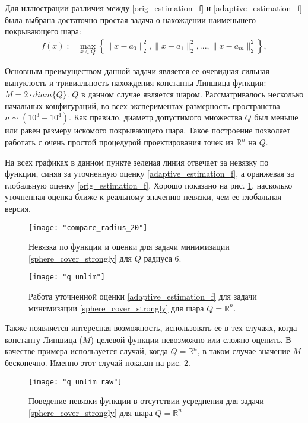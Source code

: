 Для иллюстрации различия между \eqref{orig_estimation_f} и \eqref{adaptive_estimation_f} была выбрана достаточно простая задача о нахождении наименьшего покрывающего шара:
\begin{gather}\label{sphere_cover_strongly}
    f(x) := \max_{x\in Q}\left\{\|x - a_0\|_2^2, \|x - a_1\|_2^2, ..., \|x - a_m\|_2^2\right\},
\end{gather}

Основным преимуществом данной задачи является ее очевидная сильная выпуклость и тривиальность нахождения константы Липшица функции: $ M = 2 \cdot diam\{Q\} $. $Q$ в данном случае является шаром.
Рассматривалось несколько начальных конфигураций, во всех экспериментах размерность пространства $n \sim (10^3 - 10^4)$. Как правило, диаметр допустимого множества $Q$ был меньше или равен размеру искомого покрывающего шара. Такое построение позволяет работать с очень простой процедурой проектирования точек из $\mathbb{R}^n$ на $Q$.

На всех графиках в данном пункте зеленая линия отвечает за невязку по функции, синяя за уточненную оценку \eqref{adaptive_estimation_f}, а оранжевая за глобальную оценку \eqref{orig_estimation_f}. Хорошо показано на рис. \ref{r_20_q_6}, насколько уточненная оценка ближе к реальному значению невязки, чем ее глобальная версия. 

\begin{figure}[h]
	\centering
	\texttt{[image: "compare\_radius\_20"]}
    \caption{Невязка по функции и оценки для задачи минимизации \eqref{sphere_cover_strongly} для $Q$ радиуса 6.}
    \label{r_20_q_6}
\end{figure}

\begin{figure}[h]
	\centering
	\texttt{[image: "q\_unlim"]}
    \caption{Работа уточненной оценки \eqref{adaptive_estimation_f} для задачи минимизации \eqref{sphere_cover_strongly} для шара $Q = \mathbb{R}^n$.}
    \label{q_unlim}
\end{figure}

Также появляется интересная возможность, использовать ее в тех случаях, когда константу Липшица ($M$) целевой функции невозможно или сложно оценить. В качестве примера используется случай, когда $Q = \mathbb{R}^n$, в таком случае значение $M$ бесконечно. Именно этот случай показан на рис. \ref{q_unlim}. 

\begin{figure}[h]
	\centering
	\texttt{[image: "q\_unlim\_raw"]}
    \caption{Поведение невязки функции в отсутствии усреднения для задачи \eqref{sphere_cover_strongly} для шара $Q = \mathbb{R}^n$}
    \label{non_avg}
\end{figure}

